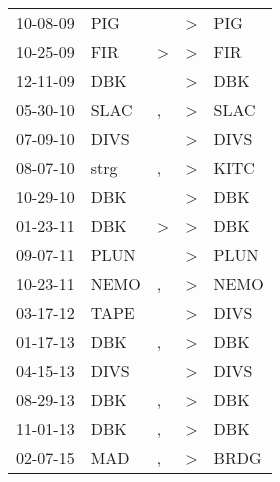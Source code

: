 \begin{supertabular}{p{0.07\textwidth}p{0.06\textwidth}p{0.02\textwidth}p{0.02\textwidth}p{0.06\textwidth}}
 10-08-09\textsuperscript{} &   PIG\textsuperscript{} &               &  \textgreater &   PIG\textsuperscript{} \\
 10-25-09\textsuperscript{} &   FIR\textsuperscript{} &  \textgreater &  \textgreater &   FIR\textsuperscript{} \\
 12-11-09\textsuperscript{} &   DBK\textsuperscript{} &               &  \textgreater &   DBK\textsuperscript{} \\
 05-30-10\textsuperscript{} &  SLAC\textsuperscript{} &             , &  \textgreater &  SLAC\textsuperscript{} \\
 07-09-10\textsuperscript{} &  DIVS\textsuperscript{} &               &  \textgreater &  DIVS\textsuperscript{} \\
 08-07-10\textsuperscript{} &  strg\textsuperscript{} &             , &  \textgreater &  KITC\textsuperscript{} \\
 10-29-10\textsuperscript{} &   DBK\textsuperscript{} &               &  \textgreater &   DBK\textsuperscript{} \\
 01-23-11\textsuperscript{} &   DBK\textsuperscript{} &  \textgreater &  \textgreater &   DBK\textsuperscript{} \\
 09-07-11\textsuperscript{} &  PLUN\textsuperscript{} &               &  \textgreater &  PLUN\textsuperscript{} \\
 10-23-11\textsuperscript{} &  NEMO\textsuperscript{} &             , &  \textgreater &  NEMO\textsuperscript{} \\
 03-17-12\textsuperscript{} &  TAPE\textsuperscript{} &               &  \textgreater &  DIVS\textsuperscript{} \\
 01-17-13\textsuperscript{} &   DBK\textsuperscript{} &             , &  \textgreater &   DBK\textsuperscript{} \\
 04-15-13\textsuperscript{} &  DIVS\textsuperscript{} &               &  \textgreater &  DIVS\textsuperscript{} \\
 08-29-13\textsuperscript{} &   DBK\textsuperscript{} &             , &  \textgreater &   DBK\textsuperscript{} \\
 11-01-13\textsuperscript{} &   DBK\textsuperscript{} &             , &  \textgreater &   DBK\textsuperscript{} \\
 02-07-15\textsuperscript{} &   MAD\textsuperscript{} &             , &  \textgreater &  BRDG\textsuperscript{} \\

\end{supertabular}
